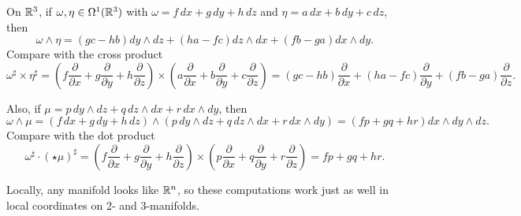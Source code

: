\begin{example}
	On $\mathbb{R}^3$, if $\omega, \eta \in \Omega^1(\mathbb{R}^3)$ with $\omega = f \, dx + g \, dy + h \, dz$ and $\eta = a\, dx + b\, dy + c \, dz$, then
	\[
		\omega \wedge \eta = (gc-hb)dy \wedge dz + (ha-fc)dz \wedge dx + (fb-ga)dx \wedge dy.
	\]
	Compare with the cross product
	\[
		\omega^\sharp \times \eta^\sharp = \left(f \frac{\partial}{\partial x} + g \frac{\partial}{\partial y}+h \frac{\partial}{\partial z}\right) \times \left( a \frac{\partial}{\partial x} + b \frac{\partial}{\partial y}+ c \frac{\partial}{\partial z}\right) = (gc-hb) \frac{\partial}{\partial x} + (ha-fc) \frac{\partial}{\partial y} + (fb-ga) \frac{\partial}{\partial z}.
	\]
	
	Also, if $\mu = p\, dy \wedge dz + q\, dz \wedge dx + r\, dx \wedge dy$, then
	\[
		\omega \wedge \mu = (f \, dx + g \, dy + h \, dz ) \wedge (p\, dy \wedge dz + q\, dz \wedge dx + r\, dx \wedge dy) = (fp + gq + hr) dx \wedge dy \wedge dz.
	\]
	Compare with the dot product
	\[
		\omega^\sharp \cdot (\star \mu)^\sharp = \left(f \frac{\partial}{\partial x} + g \frac{\partial}{\partial y}+h \frac{\partial}{\partial z}\right) \times \left( p \frac{\partial}{\partial x} + q \frac{\partial}{\partial y}+ r \frac{\partial}{\partial z}\right) = fp + gq + hr.
	\]
\end{example}

Locally, any manifold looks like $\mathbb{R}^n$, so these computations work just as well in local coordinates on 2- and 3-manifolds.
